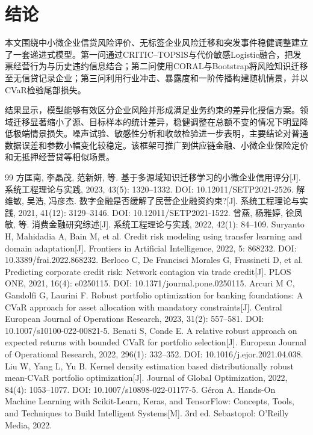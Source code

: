 \documentclass[UTF8,a4paper,12pt,fontset=fandol]{ctexart}
\numberwithin{equation}{section}
\begin{document}
\section{结论}

本文围绕中小微企业信贷风险评价、无标签企业风险迁移和突发事件稳健调整建立了一套递进式模型。第一问通过CRITIC--TOPSIS与代价敏感Logistic融合，把发票经营行为与历史违约信息结合；第二问使用CORAL与Bootstrap将风险知识迁移至无信贷记录企业；第三问利用行业冲击、暴露度和一阶传播构建随机情景，并以CVaR检验尾部损失。

结果显示，模型能够有效区分企业风险并形成满足业务约束的差异化授信方案。领域迁移显著缩小了源、目标样本的统计差异，稳健调整在总额不变的情况下明显降低极端情景损失。噪声试验、敏感性分析和收敛检验进一步表明，主要结论对普通数据误差和参数小幅变化较稳定。该框架可推广到供应链金融、小微企业保险定价和无抵押经营贷等相似场景。

\begin{thebibliography}{99}
 方匡南, 李晶茂, 范新妍, 等. 基于多源域知识迁移学习的小微企业信用评分[J]. 系统工程理论与实践, 2023, 43(5): 1320--1332. DOI: 10.12011/SETP2021-2526.
 解维敏, 吴浩, 冯彦杰. 数字金融是否缓解了民营企业融资约束?[J]. 系统工程理论与实践, 2021, 41(12): 3129--3146. DOI: 10.12011/SETP2021-1522.
 曾燕, 杨雅婷, 徐凤敏, 等. 消费金融研究综述[J]. 系统工程理论与实践, 2022, 42(1): 84--109.
 Suryanto H, Mahidadia A, Bain M, et al. Credit risk modeling using transfer learning and domain adaptation[J]. Frontiers in Artificial Intelligence, 2022, 5: 868232. DOI: 10.3389/frai.2022.868232.
 Berloco C, De Francisci Morales G, Frassineti D, et al. Predicting corporate credit risk: Network contagion via trade credit[J]. PLOS ONE, 2021, 16(4): e0250115. DOI: 10.1371/journal.pone.0250115.
 Arcuri M C, Gandolfi G, Laurini F. Robust portfolio optimization for banking foundations: A CVaR approach for asset allocation with mandatory constraints[J]. Central European Journal of Operations Research, 2023, 31(2): 557--581. DOI: 10.1007/s10100-022-00821-5.
 Benati S, Conde E. A relative robust approach on expected returns with bounded CVaR for portfolio selection[J]. European Journal of Operational Research, 2022, 296(1): 332--352. DOI: 10.1016/j.ejor.2021.04.038.
 Liu W, Yang L, Yu B. Kernel density estimation based distributionally robust mean-CVaR portfolio optimization[J]. Journal of Global Optimization, 2022, 84(4): 1053--1077. DOI: 10.1007/s10898-022-01177-5.
 G\'eron A. Hands-On Machine Learning with Scikit-Learn, Keras, and TensorFlow: Concepts, Tools, and Techniques to Build Intelligent Systems[M]. 3rd ed. Sebastopol: O'Reilly Media, 2022.
\end{thebibliography}
\end{document}
